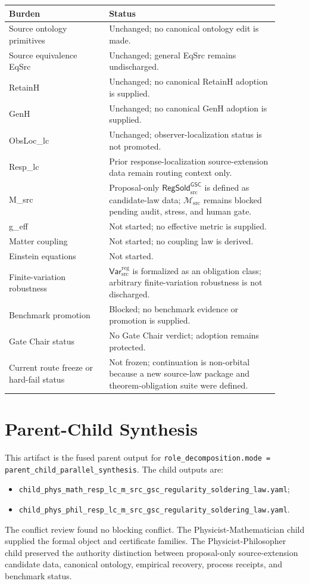 \documentclass[11pt]{article}
\newcommand{\Msrc}{\mathcal{M}_{\mathrm{src}}}
\newcommand{\RegSold}{\mathsf{RegSold}_{\mathrm{src}}^{\mathsf{GSC}}}
\newcommand{\VarRegSrc}{\mathsf{Var}^{\mathrm{reg}}_{\mathrm{src}}}
\begin{document}
\begin{center}
\begin{tabular}{p{0.33\linewidth}p{0.57\linewidth}}
\hline
Burden & Status \\
\hline
Source ontology primitives & Unchanged; no canonical ontology edit is made. \\
Source equivalence EqSrc & Unchanged; general EqSrc remains undischarged. \\
RetainH & Unchanged; no canonical RetainH adoption is supplied. \\
GenH & Unchanged; no canonical GenH adoption is supplied. \\
ObsLoc\_lc & Unchanged; observer-localization status is not promoted. \\
Resp\_lc & Prior response-localization source-extension data remain routing context only. \\
M\_src & Proposal-only \(\RegSold\) is defined as candidate-law data; \(\Msrc\) remains blocked pending audit, stress, and human gate. \\
g\_eff & Not started; no effective metric is supplied. \\
Matter coupling & Not started; no coupling law is derived. \\
Einstein equations & Not started. \\
Finite-variation robustness & \(\VarRegSrc\) is formalized as an obligation class; arbitrary finite-variation robustness is not discharged. \\
Benchmark promotion & Blocked; no benchmark evidence or promotion is supplied. \\
Gate Chair status & No Gate Chair verdict; adoption remains protected. \\
Current route freeze or hard-fail status & Not frozen; continuation is non-orbital because a new source-law package and theorem-obligation suite were defined. \\
\hline
\end{tabular}
\end{center}

\section{Parent-Child Synthesis}

This artifact is the fused parent output for
\texttt{role\_decomposition.mode = parent\_child\_parallel\_synthesis}. The
child outputs are:
\begin{itemize}
  \item \texttt{child\_phys\_math\_resp\_lc\_m\_src\_gsc\_regularity\_soldering\_law.yaml};
  \item \texttt{child\_phys\_phil\_resp\_lc\_m\_src\_gsc\_regularity\_soldering\_law.yaml}.
\end{itemize}
The conflict review found no blocking conflict. The
Physicist-Mathematician child supplied the formal object and certificate
families. The Physicist-Philosopher child preserved the authority distinction
between proposal-only source-extension candidate data, canonical ontology,
empirical recovery, process receipts, and benchmark status.
\end{document}
